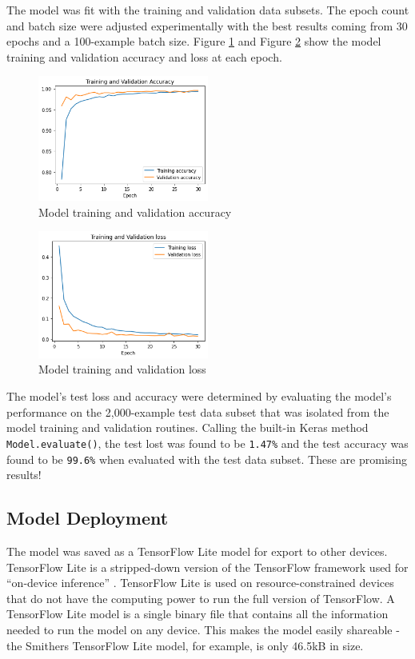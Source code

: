 \documentclass[conference]{IEEEtran}
\newcommand{\code}[1]{\texttt{#1}}
\begin{document}
The model was fit with the training and validation data subsets.
The epoch count and batch size were adjusted experimentally
with the best results coming from 30 epochs and a 100-example batch size.
Figure \ref{fig:accuracy} and Figure \ref{fig:loss}
show the model training and validation accuracy and loss at each epoch.

\begin{figure}[htbp]
    \centerline{\includegraphics[width=0.5\textwidth]{figs/accuracy.png}}
    \caption{Model training and validation accuracy}
    \label{fig:accuracy}
\end{figure}
\begin{figure}[htbp]
    \centerline{\includegraphics[width=0.5\textwidth]{figs/loss.png}}
    \caption{Model training and validation loss}
    \label{fig:loss}
\end{figure}

The model's test loss and accuracy were determined
by evaluating the model's performance on the 2,000-example test data subset
that was isolated from the model training and validation routines.
Calling the built-in Keras method \code{Model.evaluate()},
the test lost was found to be \code{1.47\%} and the test accuracy was found to be \code{99.6\%}
when evaluated with the test data subset.
These are promising results!

\subsection{Model Deployment}
The model was saved as a TensorFlow Lite model for export to other devices.
TensorFlow Lite is a stripped-down version of the TensorFlow framework
used for ``on-device inference'' \cite{tensorflowlite}.
TensorFlow Lite is used on resource-constrained devices that do not have the computing power
to run the full version of TensorFlow.
A TensorFlow Lite model is a single binary file that contains all the information needed
to run the model on any device.
This makes the model easily shareable - the Smithers TensorFlow Lite model, for example, 
is only 46.5kB in size.
\end{document}
